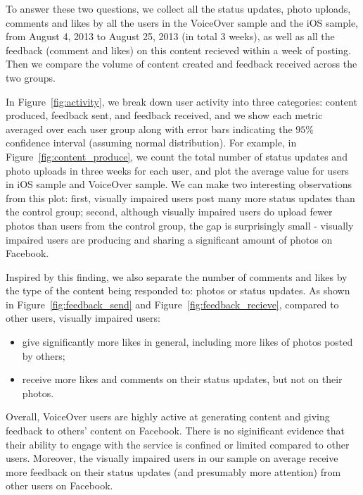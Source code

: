 \documentclass{sigchi}
\begin{document}
To answer these two questions, we collect all the status updates, photo uploads, comments and likes by all the users in the VoiceOver sample and the iOS sample, from August 4, 2013 to August 25, 2013 (in total 3 weeks), as well as all the feedback (comment and likes) on this content recieved within a week of posting.  Then we compare the volume of content created and feedback received across the two groups. 

 
In Figure~\ref{fig:activity}, we break down user activity into three categories: content produced, feedback sent, and feedback received, and we show each metric averaged over each user group along with error bars indicating the $95\%$ confidence interval (assuming normal distribution). For example, in Figure~\ref{fig:content_produce}, we count the total number of status updates and photo uploads in three weeks for each user, and plot the average value for users in iOS sample and VoiceOver sample. We can make two interesting observations from this plot: first, visually impaired users post many more status updates than the control group; second, although visually impaired users do upload fewer photos than users from the control group, the gap is surprisingly small - visually impaired users are producing and sharing a significant amount of photos on Facebook. 

Inspired by this finding, we also separate the number of comments and likes by the type of the content being responded to: photos or status updates. As shown in Figure~\ref{fig:feedback_send} and Figure~\ref{fig:feedback_recieve}, compared to other users, visually impaired users:
\begin{itemize}
\item give significantly more likes in general, including more likes of photos posted by others;
\item receive more likes and comments on their status updates, but not on their photos.
\end{itemize}

Overall, VoiceOver users are highly active at generating content and giving feedback to others' content on Facebook. There is no siginificant evidence that their ability to engage with the service is confined or limited compared to other users. Moreover, the visually impaired users in our sample on average receive more feedback on their status updates (and presumably more attention) from other users on Facebook. 
\end{document}
